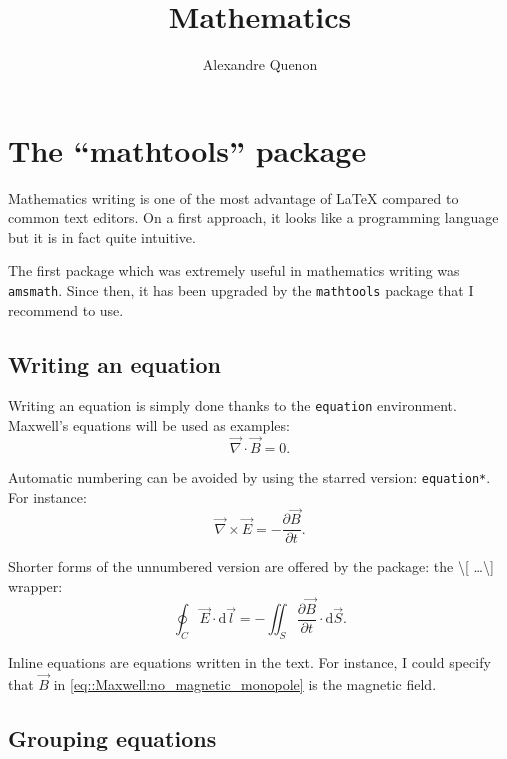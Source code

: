 \documentclass[11pt, a4paper, english]{report}
\title{Mathematics}
\author{Alexandre Quenon}
\begin{document}
\maketitle

\tableofcontents


\chapter{The \enquote{mathtools} package}

	Mathematics writing is one of the most advantage of \LaTeX{} compared to common text editors.
	On a first approach, it looks like a programming language but it is in fact quite intuitive.
	
	The first package which was extremely useful in mathematics writing was \texttt{amsmath}.
	Since then, it has been upgraded by the \texttt{mathtools} package that I recommend to use.
	
	
	\section{Writing an equation}
	
		Writing an equation is simply done thanks to the \texttt{equation} environment.
		Maxwell's equations will be used as examples:
		\begin{equation}
			\vec{\nabla}\cdot\vec{B}=0.
			\label{eq::Maxwell:no_magnetic_monopole}
		\end{equation}
		
		Automatic numbering can be avoided by using the starred version: \texttt{equation*}.
		For instance:
		\begin{equation*}
			\vec{\nabla}\times\vec{E}=-\frac{\partial\vec{B}}{\partial t}.
		\end{equation*}
		
		Shorter forms of the unnumbered version are offered by the package: the \textbackslash [ \ldots \textbackslash ] wrapper:
		\[ \oint_{C} \vec{E} \cdot \mathrm{d}\vec{l} = - \iint_{S} \frac{\partial\vec{B}}{\partial t} \cdot \mathrm{d}\vec{S}. \]
		
		Inline equations are equations written in the text.
		For instance, I could specify that $\vec{B}$ in \cref{eq::Maxwell:no_magnetic_monopole} is the magnetic field.
	
	
	\section{Grouping equations}
	
\end{document}
